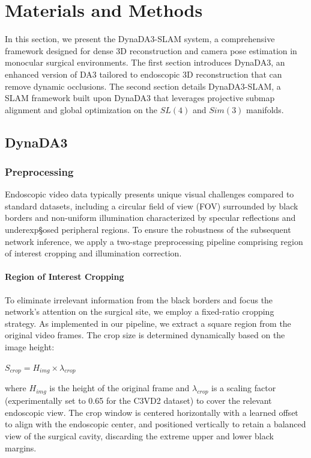 \chapter{Materials and Methods}
\label{chap:methods}
In this section, we present the DynaDA3-SLAM system, a comprehensive framework designed for dense 3D reconstruction and camera pose estimation in monocular surgical environments.
The first section introduces DynaDA3, an enhanced version of DA3 tailored to endoscopic 3D reconstruction that can remove dynamic occlusions. 
The second section details DynaDA3-SLAM, a SLAM framework built upon DynaDA3 that leverages projective submap alignment and global optimization on the $SL(4)$ and $Sim(3)$ manifolds.
\section{DynaDA3}
\label{sec:network_architecture} 
\subsection{Preprocessing}             
Endoscopic video data typically presents unique visual challenges compared to standard datasets, including a circular field of view (FOV) surrounded by black borders and non-uniform illumination characterized by specular reflections and underexp§osed peripheral regions. 
To ensure the robustness of the subsequent network inference, we apply a two-stage preprocessing pipeline comprising region of interest cropping and illumination correction.

\subsubsection{Region of Interest Cropping}
To eliminate irrelevant information from the black borders and focus the network's attention on the surgical site, we employ a fixed-ratio cropping strategy. As implemented in our pipeline, we extract a square region from the original video frames. The crop size is determined dynamically based on the image height:
\begin{center}
    $ S_{crop} = H_{img} \times \lambda_{crop} $
\end{center}
where $H_{img}$ is the height of the original frame and $\lambda_{crop}$ is a scaling factor (experimentally set to 0.65 for the C3VD2 dataset) to cover the relevant endoscopic view. The crop window is centered horizontally with a learned offset to align with the endoscopic center, and positioned vertically to retain a balanced view of the surgical cavity, discarding the extreme upper and lower black margins.


